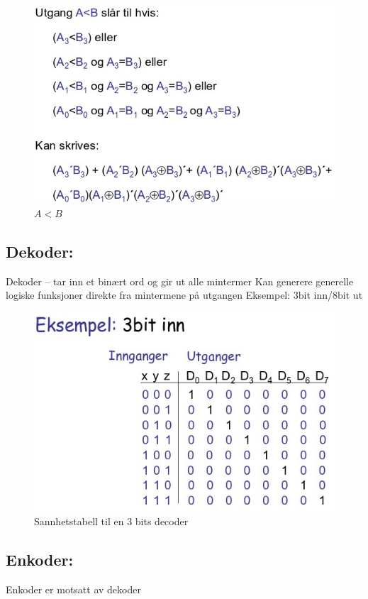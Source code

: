\documentclass{article}
\begin{document}
	\begin{figure}[H]
		\includegraphics[scale = 0.6]{komp3.jpg}
		\caption{$A<B$}
	\end{figure}
	
	\subsection*{Dekoder:}
	 Dekoder – tar inn et binært ord og gir ut alle mintermer 
	 Kan generere generelle logiske funksjoner direkte fra mintermene på utgangen 
	 Eksempel: 3bit inn/8bit ut 
	 
	\begin{figure}[H]
		\includegraphics[scale = 0.6]{decoder.jpg}
		\caption{Sannhetstabell til en 3 bits decoder}
	\end{figure}
	
	\subsection*{Enkoder:}
	Enkoder er motsatt av dekoder
	
\end{document}
